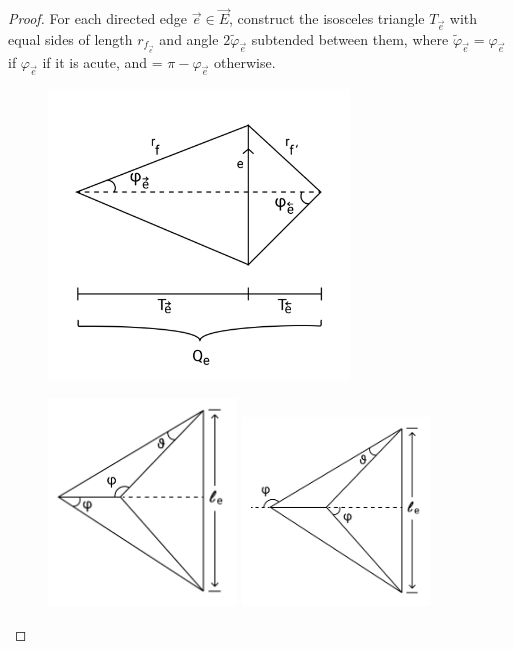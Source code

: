 \documentclass[11pt]{amsart}
\newcommand{\vphi}{\varphi}
\theoremstyle{plain}
\theoremstyle{definition}
\begin{document}
\begin{proof}
For each directed edge $\vec{e} \in \vec{E}$,
construct the isosceles triangle $T_{\vec{e}}$
with equal sides of length $r_{f_{\vec{e}}}$ and
angle $2\tilde{\vphi}_{\vec{e}}$ subtended between them,
where $\tilde{\vphi}_{\vec{e}} = \vphi_{\vec{e}}$
if $\vphi_{\vec{e}}$ if it is acute,
and = $\pi - \vphi_{\vec{e}}$ otherwise.

\begin{figure}
\includegraphics[width=8cm]{more_pictures/kite.png}
\end{figure}
\begin{figure}
\includegraphics[width=5cm]{more_pictures/positive_angle.png}
\includegraphics[width=5cm]{more_pictures/negative_angle.png}
\end{figure}



\end{proof}
\end{document}
